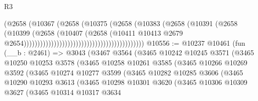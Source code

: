 \begin{lexlean}{R3}
\begin{coremodule}
                                                                (@2658
                                                                  (@10367
                                                                    (@2658
                                                                      (@10375
                                                                        (@2658
                                                                          (@10383
                                                                            (@2658
                                                                              (@10391
                                                                                (@2658
                                                                                  (@10399
                                                                                    (@2658
                                                                                      (@10407
                                                                                        (@2658
                                                                                          (@10411
                                                                                            @10413
                                                                                            @2679
                                                                                            @2654))))))))))))))))))))))))))))))))))))))))))))
@10556 := @10237
    @10461
    (fun (__b : @2461) =>
    @3043
      (@3467
        @3564
        (@3465
          @10242
          @10245
          @3571
          (@3465
            @10250
            @10253
            @3578
            (@3465
              @10258
              @10261
              @3585
              (@3465
                @10266
                @10269
                @3592
                (@3465
                  @10274
                  @10277
                  @3599
                  (@3465
                    @10282
                    @10285
                    @3606
                    (@3465
                      @10290
                      @10293
                      @3613
                      (@3465
                        @10298
                        @10301
                        @3620
                        (@3465
                          @10306
                          @10309
                          @3627
                          (@3465
                            @10314
                            @10317
                            @3634

\end{coremodule}
\end{lexlean}
